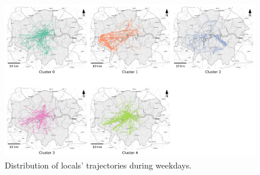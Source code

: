 \documentclass{article}
\theoremstyle{definition}
\theoremstyle{remark}
\begin{document}
\begin{figure}[!h]
\centering
\includegraphics[width=1\textwidth]{figures/traj_distribution_weekday_locals.png}
\caption{\label{fig:traj_distribution_weekday_locals}Distribution of locals' trajectories during weekdays.}
\end{figure}
\end{document}
